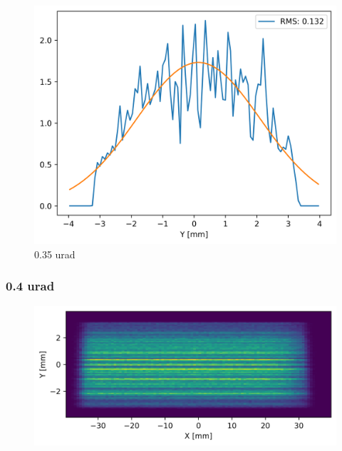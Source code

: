 \begin{figure}[H]
\centering
\includegraphics[width=0.9\linewidth]{./../figures/slope_error/WB4C_d30_d-spacing_gradient_45keV_slope_error035urad_Yprofile.png}
\caption{0.35 urad}
\label{fig:035urad}
\end{figure}

\clearpage
\subsubsection{0.4 urad}
\begin{figure}[H]
\centering
\includegraphics[width=0.9\linewidth]{./../figures/slope_error/WB4C_d30_d-spacing_gradient_45keV_slope_error04urad.png}
\end{figure}

